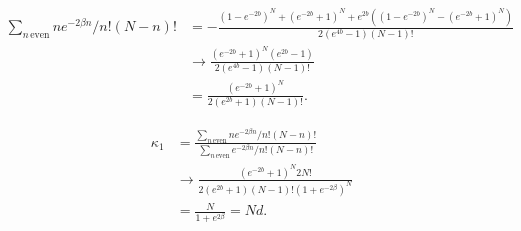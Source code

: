 \documentclass{article}
\begin{document}
\begin{align*}
    \sum_{n \, \text{even}} ne^{-2\beta n}/n!(N-n)! & = -\frac{(1 - e^{-2 b})^N  + (e^{-2 b}  + 1)^N  + e^{2 b}  ((1 - e^{-2 b})^N  - (e^{-2 b}  + 1)^N )}{2 (e^{4 b}  - 1)(N - 1)!} \\
                                                    & \rightarrow \frac{(e^{-2 b}  + 1)^N (e^{2 b}-1)}{2 (e^{4 b}  - 1)(N - 1)! }                                                    \\
                                                    & = \frac{(e^{-2 b}  + 1)^N}{2 (e^{2b}+ 1)(N - 1)! }.
\end{align*}

\begin{align*}
    \kappa_1 & = \frac{\sum_{n \, \text{even}} ne^{-2\beta n}/n!(N-n)!}{\sum_{n \, \text{even}} e^{-2\beta n}/n!(N-n)! } \\
             & \rightarrow \frac{(e^{-2 b}  + 1)^N 2N!}{2 (e^{2b}+ 1)(N - 1)!(1+e^{-2\beta})^N  }                        \\
             & = \frac{N}{1+e^{2\beta}} = Nd.
\end{align*}
\end{document}
